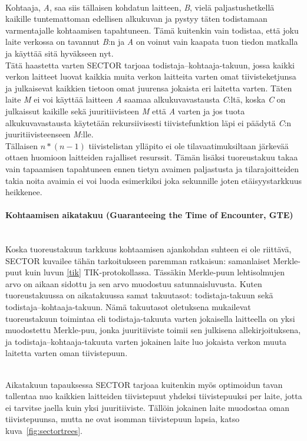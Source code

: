 \documentclass[finnish]{tktltiki2}
\theoremstyle{definition}
\theoremstyle{remark}
\begin{document}
\noindent\\
Kohtaaja, \emph{A}, saa siis tällaisen kohdatun laitteen, \emph{B}, vielä paljastushetkellä kaikille tuntemattoman edellisen alkukuvan ja pystyy täten todistamaan varmentajalle kohtaamisen tapahtuneen. Tämä kuitenkin vain todistaa, että joku laite verkossa on tavannut \emph{B}:n ja \emph{A} on voinut vain kaapata tuon tiedon matkalla ja käyttää sitä hyväkseen nyt. 
\noindent\\
Tätä haastetta varten SECTOR tarjoaa todistaja--kohtaaja-takuun, jossa kaikki verkon laitteet luovat kaikkia muita verkon laitteita varten omat tiivisteketjunsa ja julkaisevat kaikkien tietoon omat juurensa jokaista eri laitetta varten. Täten laite \emph{M} ei voi käyttää laitteen \emph{A} saamaa alkukuvavastausta \emph{C}:ltä, koska \emph{C} on julkaissut kaikille sekä juuritiivisteen \emph{M} että \emph{A} varten ja jos tuota alkukuvavastausta käytetään rekursiivisesti tiivistefunktion läpi ei päädytä \emph{C}:n juuritiivisteenseen \emph{M}:lle.
\noindent\\
Tällaisen $n*(n-1)$ tiivistelistan ylläpito ei ole tilavaatimuksiltaan järkevää ottaen huomioon laitteiden rajalliset resurssit. Tämän lisäksi tuoreustakuu takaa vain tapaamisen tapahtuneen ennen tietyn avaimen paljastusta ja tilarajoitteiden takia noita avaimia ei voi luoda esimerkiksi joka sekunnille joten etäisyystarkkuus heikkenee.

\paragraph{Kohtaamisen aikatakuu (Guaranteeing the Time of Encounter, GTE)}
\noindent\\
Koska tuoreustakuun tarkkuus kohtaamisen ajankohdan suhteen ei ole riittävä, SECTOR kuvailee tähän tarkoitukseen paremman ratkaisun: samanlaiset Merkle-puut kuin luvun \ref{tik} TIK-protokollassa. Tässäkin Merkle-puun lehtisolmujen arvo on aikaan sidottu ja sen arvo muodostuu satunnaisluvusta. Kuten tuoreustakuussa on aikatakuussa samat takuutasot: todistaja-takuun sekä todistaja--kohtaaja-takuun. Nämä takuutasot oletuksena mukailevat tuoreustakuun toimintaa eli todistaja-takuuta varten jokaisella laitteella on yksi muodostettu Merkle-puu, jonka juuritiiviste toimii sen julkisena allekirjoituksena, ja todistaja--kohtaaja-takuuta varten jokainen laite luo jokaista verkon muuta laitetta varten oman tiivistepuun.

\noindent\\
Aikatakuun tapauksessa SECTOR tarjoaa kuitenkin myös optimoidun tavan tallentaa nuo kaikkien laitteiden tiivistepuut yhdeksi tiivistepuuksi per laite, jotta ei tarvitse jaella kuin yksi juuritiiviste. Tällöin jokainen laite muodostaa oman tiivistepuunsa, mutta ne ovat isomman tiivistepuun lapsia, katso kuva~\ref{fig:sectortrees}.
\end{document}
